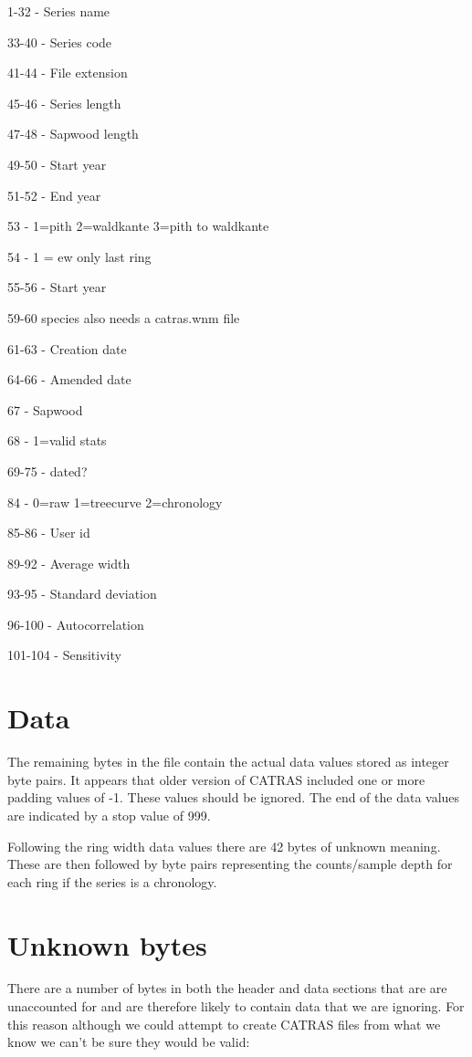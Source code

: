 \begin{itemize*}
 \item 1-32 - Series name
\item  33-40 - Series code
\item  41-44 - File extension
\item  45-46 - Series length
\item  47-48 - Sapwood length
\item  49-50 - Start year
\item  51-52 - End year
\item  53 - 1=pith 2=waldkante 3=pith to waldkante
\item  54 - 1 = ew only last ring
\item  55-56 - Start year
\item  59-60 species also needs a catras.wnm file
\item  61-63 - Creation date
\item  64-66 - Amended date
\item  67 - Sapwood
\item  68 - 1=valid stats
\item  69-75 - dated?
\item  84 - 0=raw 1=treecurve 2=chronology
\item  85-86 - User id
\item  89-92 - Average width
\item  93-95 - Standard deviation
\item  96-100 - Autocorrelation
\item  101-104 - Sensitivity 
\end{itemize*}


\section{Data}

The remaining bytes in the file contain the actual data values stored as integer byte pairs. It appears that older version of CATRAS included one or more padding values of -1. These values should be ignored. The end of the data values are indicated by a stop value of 999.

Following the ring width data values there are 42 bytes of unknown meaning. These are then followed by byte pairs representing the counts/sample depth for each ring if the series is a chronology. 

\section{Unknown bytes}
There are a number of bytes in both the header and data sections that are are unaccounted for and are therefore likely to contain data that we are ignoring. For this reason although we could attempt to create CATRAS files from what we know we can't be sure they would be valid: 

